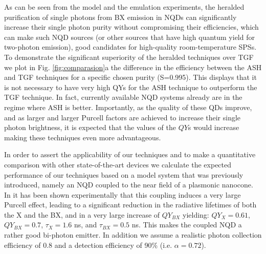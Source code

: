 \documentclass[journal=nalefd,manuscript=letter]{achemso}
\begin{document}
As can be seen from the model and the emulation experiments, the heralded purification of single photons from BX emission in NQDs can significantly increase their single photon purity without compromising their efficiencies, which can make such NQD sources (or other sources that have high quantum yield for two-photon emission), good candidates for high-quality room-temperature SPSs.
To demonstrate the significant superiority of the heralded techniques over TGF we plot in Fig. \ref{fig:comparasion}a the difference in the efficiency between the ASH and TGF techniques for a specific chosen purity (S=0.995). 
This displays that it is not necessary to have very high QYs for the ASH technique to outperform the TGF technique. 
In fact, currently available NQD systems already are in the regime where ASH is better. 
Importantly, as the quality of these QDs improve, and as larger and larger Purcell factors are achieved to increase their single photon brightness, it is expected that the values of the $QY$s would increase making these techniques even more advantageous. 

In order to assert the applicability of our techniques and to make a quantitative comparison with other state-of-the-art devices we calculate the expected performance of our techniques based on a model system that was previously introduced, namely an NQD coupled to the near field of a plasmonic nanocone. 
In \citet{Matsuzaki2017StrongAntenna} it has been shown experimentally that this coupling induces a very large Purcell effect, leading to a significant reduction in the radiative lifetimes of both the X and the BX, and in a very large increase of $QY_{BX}$ yielding: $QY_X=0.61$, $QY_{BX}=0.7$, $\tau_X=1.6$ ns, and $\tau_{BX}=0.5$ ns. This makes the coupled NQD a rather good bi-photon emitter.  
In addition we assume a realistic photon collection efficiency of 0.8 \cite{Abudayyeh2017QuantumSources} and a detection efficiency of 90\% \cite{Ma2015SimulationDiode,Zang2017SiliconTrapping}(i.e. $\alpha = 0.72$).
\end{document}
